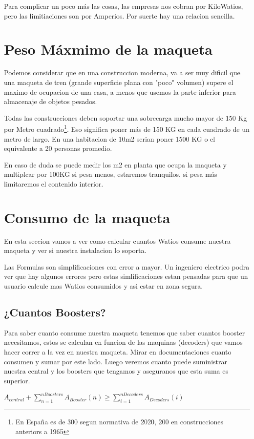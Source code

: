 Para complicar un poco más las cosas, las empresas nos cobran por KiloWatios, pero las limitiaciones son por Amperios. Por suerte hay una relacion sencilla.
\section{Peso Máxmimo de la maqueta}
Podemos considerar que en una construccion moderna, va a ser muy dificil que una maqueta de tren (grande superficie plana con "poco" volumen) supere el maximo de ocupacion de una casa, a menos que usemos la parte inferior para almacenaje de objetos pesados.

Todas las construcciones deben soportar una sobrecarga mucho mayor de 150 Kg por Metro cuadrado\footnote{En España es de 300 segun normativa de 2020, 200 en construcciones anteriors a 1965}. Eso significa poner más de 150 KG en cada cuadrado de un metro de largo. En una habitacion de 10m2 serian poner 1500 KG o el equivalente a 20 personas promedio. 

En caso de duda se puede medir los m2 en planta que ocupa la maqueta y multiplcar por 100KG si pesa menos, estaremos tranquilos, si pesa más limitaremos el contenido interior.

\section{Consumo de la maqueta}
En esta seccion vamos a ver como calcular cuantos Watios consume nuestra maqueta y ver si nuestra instalacion lo soporta.

Las Formulas son simplificaciones con error a mayor. Un ingeniero electrico podra ver que hay algunos errores pero estas simlificaciones estan pensadas para que un usuario calcule mas Watios consumidos y asi estar en zona segura.
\subsection{¿Cuantos Boosters?}
Para saber cuanto consume nuestra maqueta tenemos que saber cuantos booster necesitamos, estos se calculan en funcion de las maquinas (decoders) que vamos hacer correr a la vez en nuestra maqueta. Mirar en documentaciones cuanto consumen y sumar por este lado. Luego veremos cuanto puede suministrar nuestra central y los boosters que tengamos y aseguranos que esta suma es superior.

$A_{central} + \sum_{n=1}^{nBoosters}A_{Booster}(n) \geq \sum_{i=1}^{nDecoders}A_{Decoders}(i)$

